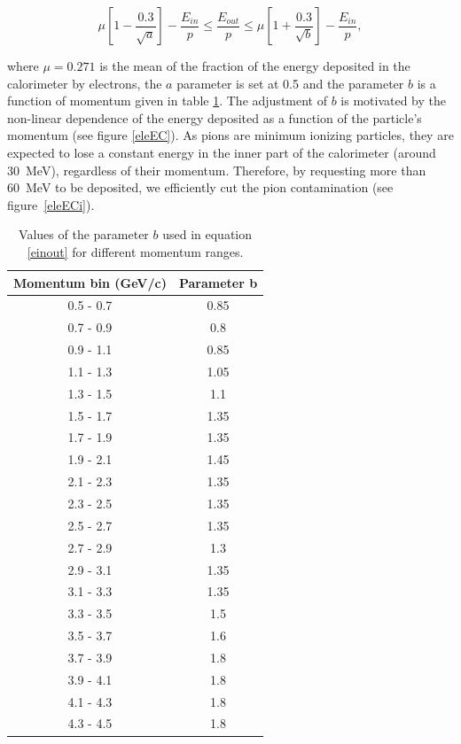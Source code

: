 \begin{equation}
\label{einout}
\mu  \left[1-\frac{0.3}{\sqrt{a}}\right] - \frac{E_{in}}{p} \leq 
\frac{E_{out}}{p} \leq 
\mu  \left[1+\frac{0.3}{\sqrt{b}}\right] - \frac{E_{in}}{p},
\end{equation}

where $\mu = 0.271$ is the mean of the fraction of the energy deposited in the 
calorimeter by electrons, the $a$ parameter is set at 0.5 and the parameter 
$b$ is a function of momentum given in table \ref{tab:ecoutin-par}. The 
adjustment of $b$ is motivated by the non-linear dependence of the energy 
deposited as a function of the particle's momentum (see figure \ref{eleEC}). As pions are 
minimum ionizing particles, they are expected to lose a constant energy in 
the inner part of the calorimeter (around 30~MeV), regardless of their 
momentum. Therefore, by requesting more than 60~MeV to be deposited, we 
efficiently cut the pion contamination (see figure~\ref{eleECi}).

\begin{table}[tbp]
  \centering
  \begin{tabular}{@{} cc @{}}
    \hline
    Momentum bin (GeV/c)& Parameter b \\ 
    \hline
    0.5 - 0.7 & 0.85 \\
    0.7 - 0.9 & 0.8  \\
    0.9 - 1.1 & 0.85 \\
    1.1 - 1.3 & 1.05 \\
    1.3 - 1.5 & 1.1  \\
    1.5 - 1.7 & 1.35 \\
    1.7 - 1.9 & 1.35 \\
    1.9 - 2.1 & 1.45 \\
    2.1 - 2.3 & 1.35 \\
    2.3 - 2.5 & 1.35 \\
    2.5 - 2.7 & 1.35 \\
    2.7 - 2.9 & 1.3  \\
    2.9 - 3.1 & 1.35 \\
    3.1 - 3.3 & 1.35 \\
    3.3 - 3.5 & 1.5  \\
    3.5 - 3.7 & 1.6  \\
    3.7 - 3.9 & 1.8  \\
    3.9 - 4.1 & 1.8  \\
    4.1 - 4.3 & 1.8  \\
    4.3 - 4.5 & 1.8  \\
    \hline
  \end{tabular}
  \caption{Values of the parameter $b$ used in equation \ref{einout} for 
           different momentum ranges.}
  \label{tab:ecoutin-par}
\end{table}


